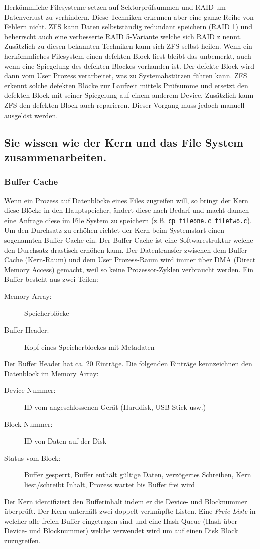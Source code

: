 Herkömmliche Filesysteme setzen auf Sektorprüfsummen und RAID um Datenverlust zu verhindern. Diese Techniken erkennen aber eine ganze Reihe von Fehlern nicht. ZFS kann Daten selbstständig redundant speichern (RAID 1) und beherrscht auch eine verbesserte RAID 5-Variante welche sich RAID z nennt. Zusätzlich zu diesen bekannten Techniken kann sich ZFS selbst heilen. Wenn ein herkömmliches Filesystem einen defekten Block liest bleibt das unbemerkt, auch wenn eine Spiegelung des defekten Blockes vorhanden ist. Der defekte Block wird dann vom User Prozess verarbeitet, was zu Systemabstürzen führen kann. ZFS erkennt solche defekten Blöcke zur Laufzeit mittels Prüfsumme und ersetzt den defekten Block mit seiner Spiegelung auf einem anderem Device. Zusätzlich kann ZFS den defekten Block auch reparieren. Dieser Vorgang muss jedoch manuell ausgelöst werden.

\subsection{Sie wissen wie der Kern und das File System zusammenarbeiten.}

\subsubsection{Buffer Cache}

Wenn ein Prozess auf Datenblöcke eines Files zugreifen will, so bringt der Kern diese Blöcke in den Hauptspeicher, ändert diese nach Bedarf und macht danach eine Anfrage diese im File System zu speichern (z.B. \texttt{cp fileone.c filetwo.c}). Um den Durchsatz zu erhöhen richtet der Kern beim Systemstart einen sogenannten Buffer Cache ein. Der Buffer Cache ist eine Softwarestruktur welche den Durchsatz drastisch erhöhen kann. Der Datentransfer zwischen dem Buffer Cache (Kern-Raum) und dem User Prozess-Raum wird immer über DMA (Direct Memory Access) gemacht, weil so keine Prozessor-Zyklen verbraucht werden.
Ein Buffer besteht aus zwei Teilen:
\begin{description}
	\item[Memory Array:] Speicherblöcke
	\item[Buffer Header:] Kopf eines Speicherblockes mit Metadaten
\end{description} 
Der Buffer Header hat ca. 20 Einträge. Die folgenden Einträge kennzeichnen den Datenblock im Memory Array:
\begin{description}
	\item[Device Nummer:] ID vom angeschlossenen Gerät (Harddisk, USB-Stick usw.)
	\item[Block Nummer:] ID von Daten auf der Disk
	\item[Status vom Block:] Buffer gesperrt, Buffer enthält gültige Daten, verzögertes Schreiben, Kern liest/schreibt Inhalt, Prozess wartet bis Buffer frei wird
\end{description}
Der Kern identifiziert den Bufferinhalt indem er die Device- und Blocknummer überprüft. Der Kern unterhält zwei doppelt verknüpfte Listen. Eine \emph{Freie Liste} in welcher alle freien Buffer eingetragen sind und eine Hash-Queue (Hash über Device- und Blocknummer) welche verwendet wird um auf einen Disk Block zuzugreifen.

